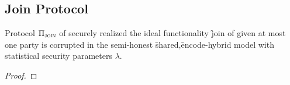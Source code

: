 %
%				
%			
%
%
%
%




\subsection{Join Protocol}\label{sec:join-proof}



\begin{theorem}\label{thm:join}
	Protocol $\Pi_{\textsc{join}}$ of  securely realized the ideal functionality \f{join} of  given at most one party is corrupted in the semi-honest \f{shared},\f{encode}-hybrid model with statistical security parameters $\lambda$.
\end{theorem}
\begin{proof}
\end{proof}


